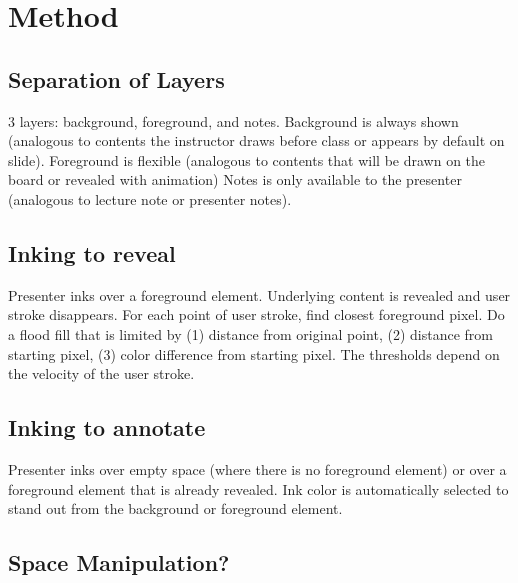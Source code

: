 \section{Method}

\subsection{Separation of Layers}
3 layers: background, foreground, and notes.
Background is always shown (analogous to contents the instructor draws before class or appears by default on slide).
Foreground is flexible (analogous to contents that will be drawn on the board or revealed with animation) 
Notes is only available to the presenter (analogous to lecture note or presenter notes). 

\subsection{Inking to reveal}
Presenter inks over a foreground element. Underlying content is revealed and user stroke disappears.
For each point of user stroke, find closest foreground pixel. Do a flood fill that is limited by (1) distance from original point, (2) distance from starting pixel, (3) color difference from starting pixel. The thresholds depend on the velocity of the user stroke. 

\subsection{Inking to annotate}
Presenter inks over empty space (where there is no foreground element) or over a foreground element that is already revealed. Ink color is automatically selected to stand out from the background or foreground element.

\subsection{Space Manipulation?}
